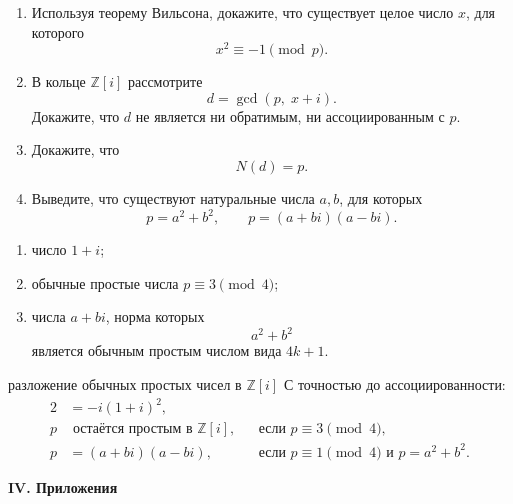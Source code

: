 
\begin{enumerate}[label=\textbf{\alph*)}, leftmargin=8mm]
    \item Используя теорему Вильсона, докажите, что существует целое
    число $x$, для которого
    \[
        x^2\equiv-1\pmod p.
    \]

    \item В кольце $\mathbb Z[i]$ рассмотрите
    \[
        d=\gcd(p,\;x+i).
    \]
    Докажите, что $d$ не является ни обратимым, ни ассоциированным
    с $p$.

    \item Докажите, что
    \[
        N(d)=p.
    \]

    \item Выведите, что существуют натуральные числа $a,b$, для которых
    \[
        p=a^2+b^2,
        \qquad
        p=(a+bi)(a-bi).
    \]
\end{enumerate}

\medskip


\begin{enumerate}[label=\textbf{\arabic*)}, leftmargin=10mm]
    \item число $1+i$;

    \item обычные простые числа $p\equiv3\pmod4$;

    \item числа $a+bi$, норма которых
    \[
        a^2+b^2
    \]
    является обычным простым числом вида $4k+1$.
\end{enumerate}

\begin{factbox}{разложение обычных простых чисел в $\mathbb Z[i]$}
С точностью до ассоциированности:
\[
\begin{aligned}
    2&=-i(1+i)^2,\\
    p&\text{ остаётся простым в }\mathbb Z[i],
        &&\text{если }p\equiv3\pmod4,\\
    p&=(a+bi)(a-bi),
        &&\text{если }p\equiv1\pmod4
          \text{ и }p=a^2+b^2.
\end{aligned}
\]
\end{factbox}

\begin{center}
    {\large\bfseries IV. Приложения}
\end{center}

